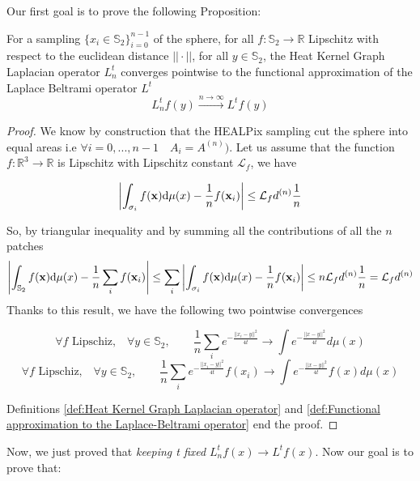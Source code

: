 Our first goal is to prove the following Proposition: 
\vspace{0.5cm}
\begin{prop}\label{prop:1}
	For a sampling $\{x_i\in\mathbb S_2\}_{i=0}^{n-1}$ of the sphere, for all $f: \mathbb S_2 \rightarrow \mathbb R$ Lipschitz with respect to the euclidean distance $||\cdot||$, for all $y\in\mathbb S_2$, the Heat Kernel Graph Laplacian operator $L^t_n$ converges pointwise to the functional approximation of the Laplace Beltrami operator $L^t$
	$$ L_n^tf(y)\xrightarrow{n\to\infty} L^tf(y)$$
\end{prop} 
\vspace{0.5cm}


\begin{proof}
	We know by construction that the HEALPix sampling cut the sphere into equal areas i.e $\forall i=0, ..., n-1\quad A_i = A^{(n)}) $.
	Let us assume that the function $f:\mathbb R^3\rightarrow \mathbb R$ is Lipschitz with Lipschitz constant $\mathcal L_f$, we have 
	
	$$\left| \int_{\sigma_{i}}f({\bf x})\text{d}{\mu(x)} - \frac{1}{n}f(\mathbf x_i)\right| \leq \mathcal L_fd^{(n)}\frac{1}{n} $$

	So, by triangular inequality and by summing all the contributions of all the $n$ patches
	$$\left| \int_{\mathbb S_2}f({\bf x})\text{d}{\mu(x)} - \frac{1}{n}\sum_i f(\mathbf x_i)\right| \leq \sum_i \left| \int_{\sigma_{i}}f({\bf x})\text{d}{\mu(x)} - \frac{1}{n}f(\mathbf x_i)\right|\leq n  \mathcal L_fd^{(n)}\frac{1}{n} = \mathcal L_fd^{(n)}$$	
	Thanks to this result, we have the following two pointwise convergences
	
	$$\forall f \text{ Lipschiz,}\quad \forall y\in\mathbb S_2,  \quad\quad \frac{1}{n}\sum_i e^{-\frac{||x_i-y||^2}{4t}}\rightarrow \int e^{-\frac{||x-y||^2}{4t}}d\mu(x)$$
	$$\forall f \text{ Lipschiz,}\quad \forall y\in\mathbb S_2,  \quad\quad \frac{1}{n}\sum_i e^{-\frac{||x_i-y||^2}{4t}}f(x_i)\rightarrow \int e^{-\frac{||x-y||^2}{4t}}f(x)d\mu(x)$$
	
	Definitions \ref{def:Heat Kernel Graph Laplacian operator} and \ref{def:Functional approximation to the Laplace-Beltrami operator} end the proof.
\end{proof}
\vspace{0.5cm}

Now, we just proved that \textit{keeping t fixed} $L_n^tf(x)\rightarrow L^tf(x)$. Now our goal is to prove that:

